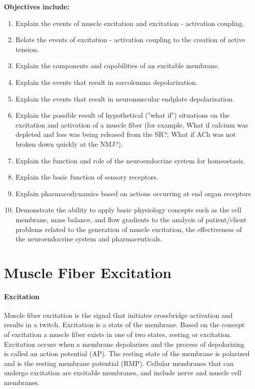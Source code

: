 \textbf{Objectives include:}
\begin{enumerate}
    \item Explain the events of muscle excitation and excitation - activation coupling.
    \item Relate the events of excitation - activation coupling to the creation of active tension.
\item Explain the components and capabilities of an excitable membrane.
    \item Explain the events that result in sarcolemma depolarization.
   \item Explain the events that result in neuromuscular endplate depolarization.
   \item Explain the possible result of hypothetical ("what if") situations on the excitation and activation of a muscle fiber (for example, What if calcium was depleted and less was being released from the SR?; What if ACh was not broken down quickly at the NMJ?).
    \item Explain the function and role of the neuroendocrine system for homeostasis.
\item Explain the basic function of sensory receptors.
    \item Explain pharmacodynamics based on actions occurring at end organ receptors
   \item Demonstrate the ability to apply basic physiology concepts such as the cell membrane, mass balance, and flow gradients to the analysis of patient/client problems related to the generation of muscle excitation, the effectiveness of the neuroendocrine system and pharmaceuticals.
\end{enumerate}

\section{Muscle Fiber Excitation} %
\paragraph{Excitation}
Muscle fiber excitation is the signal that initiates crossbridge activation and results in a twitch. Excitation is a state of the membrane. Based on the concept of excitation a muscle fiber exists in one of two states, resting or excitation. Excitation occurs when a membrane depolarizes and the process of depolarizing is called an action potential (AP). The resting state of the membrane is polarized and is the resting membrane potential (RMP). Cellular membranes that can undergo excitation are excitable membranes, and include nerve and muscle cell membranes. 

